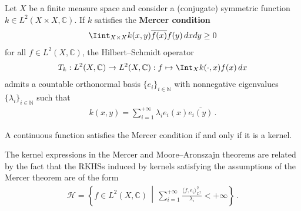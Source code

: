     \begin{theorem}[Mercer]
        Let $X$ be a finite measure space and consider a (conjugate) symmetric function $k\in L^2(X\times X,\mathbb{C})$. If $k$ satisfies the \textbf{Mercer condition}
        \begin{gather}
            \Iint_{X\times X}k(x,y)\overline{f(x)}f(y)\,dxdy\geq0
        \end{gather}
        for all $f\in L^2(X,\mathbb{C})$, the Hilbert--Schmidt operator
        \begin{gather}
            T_k:L^2(X,\mathbb{C})\rightarrow L^2(X,\mathbb{C}):f\mapsto\Int_Xk(\cdot,x)f(x)\,dx
        \end{gather}
        admits a countable orthonormal basis $\{e_i\}_{i\in\mathbb{N}}$ with nonnegative eigenvalues $\{\lambda_i\}_{i\in\mathbb{N}}$ such that
        \begin{gather}
            k(x,y) = \sum_{i=1}^{+\infty}\lambda_ie_i(x)\overline{e_i(y)}\,.
        \end{gather}
    \end{theorem}
    \begin{theorem}[Bochner]
        A continuous function satisfies the Mercer condition if and only if it is a kernel.
    \end{theorem}


    \begin{remark}
        The kernel expressions in the Mercer and Moore--Aronszajn theorems are related by the fact that the RKHSs induced by kernels satisfying the assumptions of the Mercer theorem are of the form
        \begin{gather}
            \mathcal{H} = \left\{f\in L^2(X,\mathbb{C})\,\middle\vert\,\sum_{i=1}^{+\infty}\frac{\langle f,e_i \rangle^2_{L^2}}{\lambda_i}<+\infty\right\}\,.
        \end{gather}
    \end{remark}

